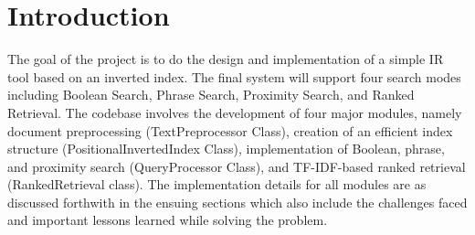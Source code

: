 \section{Introduction}
The goal of the project is to do the design and implementation of a simple IR tool based on an inverted index. The final system will support four search modes including Boolean Search, Phrase Search, Proximity Search, and Ranked Retrieval. The codebase involves the development of four major modules, namely document preprocessing (TextPreprocessor Class), creation of an efficient index structure (PositionalInvertedIndex Class), implementation of Boolean, phrase, and proximity search (QueryProcessor Class), and TF-IDF-based ranked retrieval (RankedRetrieval class). The implementation details for all modules are as discussed forthwith in the ensuing sections which also include the challenges faced and important lessons learned while solving the problem.